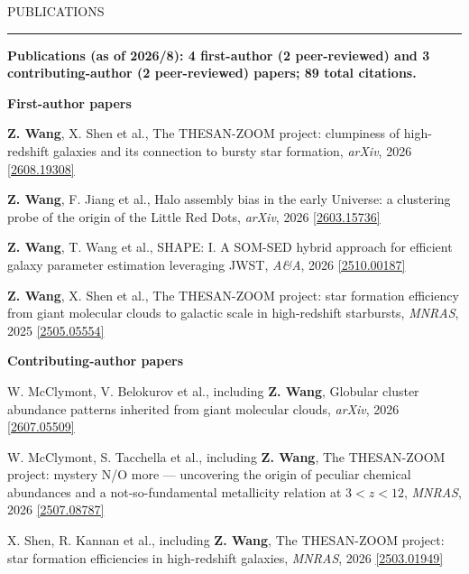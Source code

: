 \documentclass{resume} %
\newcommand{\myname}{\textcolor{CarnegieMellonRed}{\textbf{Z. Wang}}}
\newcommand{\pubentry}[6]{\noindent[#1] #2, #3, \textit{#4}, #5 \href{https://arxiv.org/abs/#6}{[#6]}\par}
\renewenvironment{rSection}[1]{
\sectionskip
\textcolor{CarnegieMellonRed}{\MakeUppercase{#1}}
\sectionlineskip
\hrule
\begin{list}{}{
\setlength{\leftmargin}{1.5em}
}
\item[]
}{
\end{list}
}
\begin{document}


\begin{rSection}{Publications} \itemsep -2pt
{\bf Publications (as of 2026/8): 4 first-author (2 peer-reviewed) and 3 contributing-author (2 peer-reviewed) papers;
89 total citations.}

{\bf First-author papers}\par
\pubentry{1}{\myname, X. Shen et al.}{The THESAN-ZOOM project: clumpiness of high-redshift galaxies and its connection to bursty star formation}{arXiv}{2026}{2608.19308}
\pubentry{2}{\myname, F. Jiang et al.}{Halo assembly bias in the early Universe: a clustering probe of the origin of the Little Red Dots}{arXiv}{2026}{2603.15736}
\pubentry{3}{\myname, T. Wang et al.}{SHAPE: I. A SOM-SED hybrid approach for efficient galaxy parameter estimation leveraging JWST}{A\&A}{2026}{2510.00187}
\pubentry{4}{\myname, X. Shen et al.}{The THESAN-ZOOM project: star formation efficiency from giant molecular clouds to galactic scale in high-redshift starbursts}{MNRAS}{2025}{2505.05554}

{\bf Contributing-author papers}\par
\pubentry{5}{W. McClymont, V. Belokurov et al., including \myname}{Globular cluster abundance patterns inherited from giant molecular clouds}{arXiv}{2026}{2607.05509}
\pubentry{6}{W. McClymont, S. Tacchella et al., including \myname}{The THESAN-ZOOM project: mystery N/O more --- uncovering the origin of peculiar chemical abundances and a not-so-fundamental metallicity relation at $3<z<12$}{MNRAS}{2026}{2507.08787}
\pubentry{7}{X. Shen, R. Kannan et al., including \myname}{The THESAN-ZOOM project: star formation efficiencies in high-redshift galaxies}{MNRAS}{2026}{2503.01949}

\end{rSection}
\end{document}
